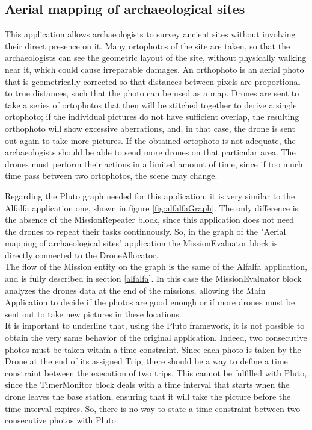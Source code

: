 \subsection{Aerial mapping of archaeological sites}\label{aerialMapping}

This application allows archaeologists to survey ancient sites without involving their direct presence on it.
Many ortophotos of the site are taken, so that the archaeologists can see the geometric layout of the site, without physically walking near it, which could cause irreparable damages.
An orthophoto is an aerial photo that is geometrically-corrected so that distances between pixels are proportional to true distances, such that the photo can be used as a map.
Drones are sent to take a series of ortophotos that then will be stitched together to derive a single ortophoto; if the individual pictures do not have sufficient overlap, the resulting orthophoto will show excessive aberrations, and, in that case, the drone is sent out again to take more pictures.
If the obtained ortophoto is not adequate, the archaeologists should be able to send more drones on that particular area.
The drones must perform their actions in a limited amount of time, since if too much time pass between two ortophotos, the scene may change.

Regarding the Pluto graph needed for this application, it is very similar to the Alfalfa\cite{alfalfa} application one, shown in figure \ref{fig:alfalfaGraph}.
The only difference is the absence of the MissionRepeater block, since this application does not need the drones to repeat their tasks continuously.
So, in the graph of the "Aerial mapping of archaeological sites" application the MissionEvaluator block is directly connected to the DroneAllocator.
\\

The flow of the Mission entity on the graph is the same of the Alfalfa\cite{alfalfa} application, and is fully described in section \ref{alfalfa}.
In this case the MissionEvaluator block analyzes the drones data at the end of the missions, allowing the Main Application to decide if the photos are good enough or if more drones must be sent out to take new pictures in these locations.
\\

It is important to underline that, using the Pluto framework, it is not possible to obtain the very same behavior of the original application.
Indeed, two consecutive photos must be taken within a time constraint.
Since each photo is taken by the Drone at the end of its assigned Trip, there should be a way to define a time constraint between the execution of two trips.
This cannot be fulfilled with Pluto, since the TimerMonitor block deals with a time interval that starts when the drone leaves the base station, ensuring that it will take the picture before the time interval expires.
So, there is no way to state a time constraint between two consecutive photos with Pluto.
\\


